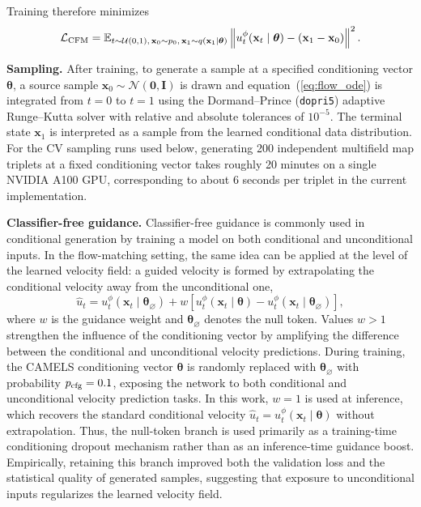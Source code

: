 \documentclass[usenatbib]{mnras}
\newcommand{\thetavec}{\boldsymbol{\theta}}
\begin{document}
Training therefore minimizes
\begin{equation}
  \mathcal{L}_{\rm CFM} =
  \mathbb{E}_{t\sim\mathcal{U}(0,1),\,
  \mathbf{x}_0\sim p_0,\,
  \mathbf{x}_1\sim q(\mathbf{x}_1\mid\thetavec)}
  \left\|
    u_t^\phi(\mathbf{x}_t\mid\thetavec)
    - (\mathbf{x}_1-\mathbf{x}_0)
  \right\|^2 .
  \label{eq:cfm}
\end{equation}

\textbf{Sampling.}
After training, to generate a sample at a specified
conditioning vector $\thetavec$, a source sample
$\mathbf{x}_0 \sim \mathcal{N}(\mathbf{0},\mathbf{I})$ is drawn and
equation~(\ref{eq:flow_ode}) is integrated from $t=0$ to $t=1$ using the
Dormand--Prince (\texttt{dopri5}) adaptive Runge--Kutta solver with
relative and absolute tolerances of $10^{-5}$. The terminal state
$\mathbf{x}_{1}$ is interpreted as a sample from the learned
conditional data distribution. For the CV sampling runs used below,
generating 200 independent multifield map triplets at a fixed
conditioning vector takes roughly 20 minutes on a single NVIDIA A100
GPU, corresponding to about 6 seconds per triplet in the current
implementation.

\textbf{Classifier-free guidance.}
Classifier-free guidance \citep[CFG;][]{Ho2022} is commonly used in
conditional generation by training a model on both conditional and
unconditional inputs. In the flow-matching setting, the same idea can
be applied at the level of the learned velocity field: a guided
velocity is formed by extrapolating the conditional velocity away from
the unconditional one,
\begin{equation}
  \hat{u}_t
  =
  u_t^\phi(\mathbf{x}_t \mid \thetavec_\varnothing)
  + w\left[
    u_t^\phi(\mathbf{x}_t \mid \thetavec)
    - u_t^\phi(\mathbf{x}_t \mid \thetavec_\varnothing)
  \right],
  \label{eq:cfg}
\end{equation}
where $w$ is the guidance weight and $\thetavec_\varnothing$ denotes
the null token. Values $w>1$ strengthen the influence of the
conditioning vector by amplifying the difference between the
conditional and unconditional velocity predictions.
During training, the CAMELS conditioning vector $\thetavec$ is randomly
replaced with $\thetavec_\varnothing$ with probability
$p_{\rm cfg}=0.1$, exposing the network to both conditional and
unconditional velocity prediction tasks. In this work, $w=1$ is used at
inference, which recovers the standard conditional velocity
$\hat{u}_t = u_t^\phi(\mathbf{x}_t \mid \thetavec)$ without
extrapolation. Thus, the null-token branch is used primarily as a
training-time conditioning dropout mechanism rather than as an
inference-time guidance boost. Empirically, retaining this branch
improved both the validation loss and the statistical quality of
generated samples, suggesting that exposure to unconditional inputs
regularizes the learned velocity field.
\end{document}
